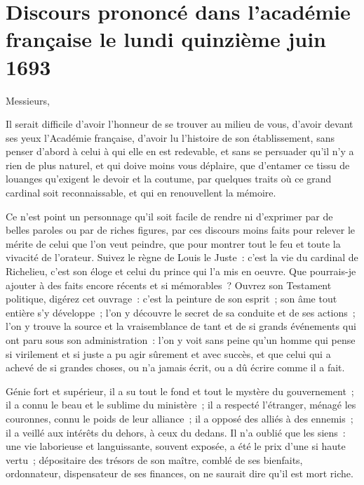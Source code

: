 \documentclass[french,twoside]{book} %
\newcommand\chapteropen{} %
\newcommand\chaptercont{} %
\begin{document}
\chapteropen
\chapter[{Discours prononcé dans l’académie française le lundi quinzième juin 1693}]{Discours prononcé dans l’académie française le lundi quinzième juin 1693}
\label{acad-discours}\renewcommand{\leftmark}{Discours prononcé dans l’académie française le lundi quinzième juin 1693}


\chaptercont
\noindent Messieurs,\par
Il serait difficile d’avoir l’honneur de se trouver au milieu de vous, d’avoir devant ses yeux l’Académie française, d’avoir lu l’histoire de son établissement, sans penser d’abord à celui à qui elle en est redevable, et sans se persuader qu’il n’y a rien de plus naturel, et qui doive moins vous déplaire, que d’entamer ce tissu de louanges qu’exigent le devoir et la coutume, par quelques traits où ce grand cardinal soit reconnaissable, et qui en renouvellent la mémoire.\par
Ce n’est point un personnage qu’il soit facile de rendre ni d’exprimer par de belles paroles ou par de riches figures, par ces discours moins faits pour relever le mérite de celui que l’on veut peindre, que pour montrer tout le feu et toute la vivacité de l’orateur. Suivez le règne de Louis le Juste : c’est la vie du cardinal de Richelieu, c’est son éloge et celui du prince qui l’a mis en oeuvre. Que pourrais-je ajouter à des faits encore récents et si mémorables ? Ouvrez son Testament politique, digérez cet ouvrage : c’est la peinture de son esprit ; son âme tout entière s’y développe ; l’on y découvre le secret de sa conduite et de ses actions ; l’on y trouve la source et la vraisemblance de tant et de si grands événements qui ont paru sous son administration : l’on y voit sans peine qu’un homme qui pense si virilement et si juste a pu agir sûrement et avec succès, et que celui qui a achevé de si grandes choses, ou n’a jamais écrit, ou a dû écrire comme il a fait.\par
Génie fort et supérieur, il a su tout le fond et tout le mystère du gouvernement ; il a connu le beau et le sublime du ministère ; il a respecté l’étranger, ménagé les couronnes, connu le poids de leur alliance ; il a opposé des alliés à des ennemis ; il a veillé aux intérêts du dehors, à ceux du dedans. Il n’a oublié que les siens : une vie laborieuse et languissante, souvent exposée, a été le prix d’une si haute vertu ; dépositaire des trésors de son maître, comblé de ses bienfaits, ordonnateur, dispensateur de ses finances, on ne saurait dire qu’il est mort riche.\par
\end{document}
